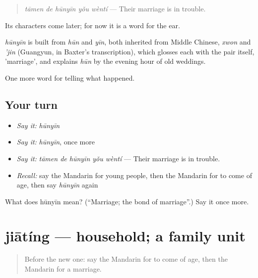 \begin{quote}
\emph{tāmen de hūnyīn yǒu wèntí} — Their marriage is in trouble.
\end{quote}

Its characters come later; for now it is a word for the ear.

\begin{cousinweb}
\emph{hūnyīn} is built from \emph{hūn} and \emph{yīn}, both inherited from Middle Chinese, \emph{xwon} and \emph{'jin} (Guangyun, in Baxter's transcription), which glosses each with the pair itself, 'marriage', and explains \emph{hūn} by the evening hour of old weddings.
\end{cousinweb}

\begin{grammarlens}[title={What you've built}]
One more word for telling what happened.
\end{grammarlens}

\subsection*{Your turn}
\begin{itemize}
\raggedright
  \item \emph{Say it:} \emph{hūnyīn}
  \item \emph{Say it:} \emph{hūnyīn}, once more
  \item \emph{Say it:} \emph{tāmen de hūnyīn yǒu wèntí} — Their marriage is in trouble.
  \item \emph{Recall:} say the Mandarin for young people, then the Mandarin for to come of age, then say \emph{hūnyīn} again
\end{itemize}

\begin{tcolorbox}[breakable,colback=teal!4,colframe=teal!35!black,title={Before you move on}]
What does hūnyīn mean? (\textquotedblleft{}Marriage; the bond of marriage\textquotedblright{}.) Say it once more.
\end{tcolorbox}
\section[jiātíng]{jiātíng — household; a family unit}

\label{lesson:ZH-C317-jiating}



\begin{quote}
Before the new one: say the Mandarin for to come of age, then the Mandarin for a marriage.
\end{quote}

